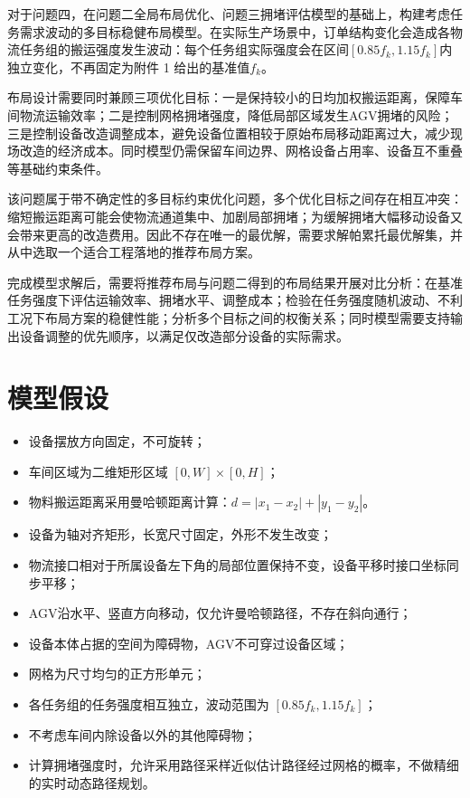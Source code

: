 \documentclass[12pt,a4paper]{article}
\begin{document}
	对于问题四，在问题二全局布局优化、问题三拥堵评估模型的基础上，构建考虑任务需求波动的多目标稳健布局模型。在实际生产场景中，订单结构变化会造成各物流任务组的搬运强度发生波动：每个任务组实际强度会在区间\([0.85f_k,1.15f_k]\)内独立变化，不再固定为附件 1 给出的基准值\(f_k\)\cite{wang2026}。
	
	布局设计需要同时兼顾三项优化目标：一是保持较小的日均加权搬运距离，保障车间物流运输效率；二是控制网格拥堵强度，降低局部区域发生AGV拥堵的风险；三是控制设备改造调整成本，避免设备位置相较于原始布局移动距离过大，减少现场改造的经济成本。同时模型仍需保留车间边界、网格设备占用率、设备互不重叠等基础约束条件。
	
	该问题属于带不确定性的多目标约束优化问题，多个优化目标之间存在相互冲突：缩短搬运距离可能会使物流通道集中、加剧局部拥堵；为缓解拥堵大幅移动设备又会带来更高的改造费用。因此不存在唯一的最优解，需要求解帕累托最优解集，并从中选取一个适合工程落地的推荐布局方案。
	
	完成模型求解后，需要将推荐布局与问题二得到的布局结果开展对比分析：在基准任务强度下评估运输效率、拥堵水平、调整成本；检验在任务强度随机波动、不利工况下布局方案的稳健性能；分析多个目标之间的权衡关系；同时模型需要支持输出设备调整的优先顺序，以满足仅改造部分设备的实际需求。
	\section{模型假设}
	\begin{itemize}
		\item 设备摆放方向固定，不可旋转；
		\item 车间区域为二维矩形区域 $[0,W]\times [0,H]$；
		\item 物料搬运距离采用曼哈顿距离计算：$d = |x_1-x_2|+|y_1-y_2|$。
		\item 设备为轴对齐矩形，长宽尺寸固定，外形不发生改变；
		\item 物流接口相对于所属设备左下角的局部位置保持不变，设备平移时接口坐标同步平移；
		\item AGV沿水平、竖直方向移动，仅允许曼哈顿路径，不存在斜向通行；
		\item 设备本体占据的空间为障碍物，AGV不可穿过设备区域；
		\item 网格为尺寸均匀的正方形单元；
		\item 各任务组的任务强度相互独立，波动范围为 $[0.85 f_k, 1.15 f_k]$；
		\item 不考虑车间内除设备以外的其他障碍物；
		\item 计算拥堵强度时，允许采用路径采样近似估计路径经过网格的概率，不做精细的实时动态路径规划。
	\end{itemize}
\end{document}
